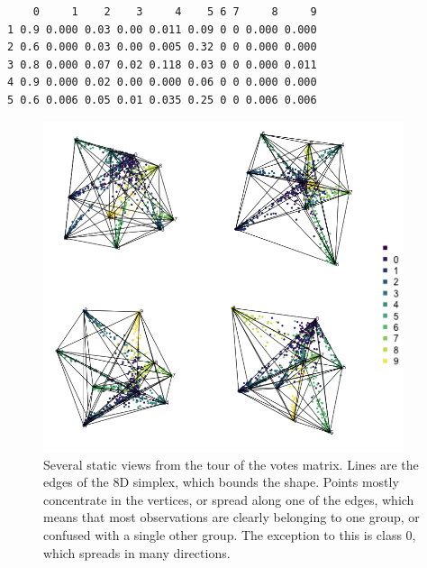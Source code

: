 \documentclass[
  letterpaper,
]{krantz}
\newenvironment{Shaded}{\begin{snugshade}}{\end{snugshade}}
\newcommand{\DecValTok}[1]{\textcolor[rgb]{0.68,0.00,0.00}{#1}}
\newcommand{\FunctionTok}[1]{\textcolor[rgb]{0.28,0.35,0.67}{#1}}
\newcommand{\NormalTok}[1]{\textcolor[rgb]{0.00,0.23,0.31}{#1}}
\newcommand{\SpecialCharTok}[1]{\textcolor[rgb]{0.37,0.37,0.37}{#1}}
\begin{document}
\begin{Shaded}
\end{Shaded}

\begin{verbatim}
    0     1    2    3     4    5 6 7     8     9
1 0.9 0.000 0.03 0.00 0.011 0.09 0 0 0.000 0.000
2 0.6 0.000 0.03 0.00 0.005 0.32 0 0 0.000 0.000
3 0.8 0.000 0.07 0.02 0.118 0.03 0 0 0.000 0.011
4 0.9 0.000 0.02 0.00 0.000 0.06 0 0 0.000 0.000
5 0.6 0.006 0.05 0.01 0.035 0.25 0 0 0.006 0.006
\end{verbatim}

\begin{figure}

\begin{minipage}{0.50\linewidth}

\includegraphics[width=4.16667in,height=\textheight]{images/ft-votes.png}

\end{minipage}%

\caption{\label{fig-ft-votes-pdf}Several static views from the tour of
the votes matrix. Lines are the edges of the 8D simplex, which bounds
the shape. Points mostly concentrate in the vertices, or spread along
one of the edges, which means that most observations are clearly
belonging to one group, or confused with a single other group. The
exception to this is class 0, which spreads in many directions.}

\end{figure}%
\end{document}
